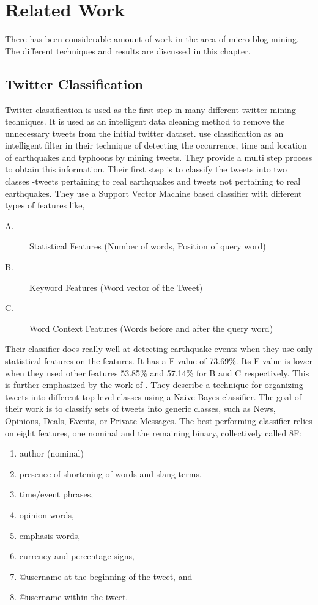 \chapter{Related Work}
\label{chap-two}
There has been considerable amount of work in the area of micro blog mining. The different techniques and results are discussed in this chapter.

\section{Twitter Classification}
Twitter classification is used as the first step in many different twitter mining techniques. It is used as an intelligent data cleaning method to remove the unnecessary tweets from the initial twitter dataset. \citet{Sakaki:2010:EST:1772690.1772777} use classification as an intelligent filter in their technique of detecting the occurrence, time and location of earthquakes and typhoons by mining tweets. They provide a multi step process to obtain this information. Their first step is to classify the tweets into two classes -tweets pertaining to real earthquakes and tweets not pertaining to real earthquakes. They use a Support Vector Machine based classifier with different types of features like,

\begin{description}
\item[A.] Statistical Features (Number of words, Position of query word)
\item[B.] Keyword Features (Word vector of the Tweet)
\item[C.] Word Context Features (Words before and after the query word)
\end{description}

Their classifier does really well at detecting earthquake events when they use only statistical features on the features. It has a F-value of 73.69\%. Its F-value is lower when they used other features 53.85\% and 57.14\% for B and C respectively. This is further emphasized by the work of \citet{Sriram:2010:STC:1835449.1835643}. They describe a technique for organizing tweets into different top level classes using a Naive Bayes classifier. The goal of their work is to classify sets of tweets into generic classes, such as News, Opinions, Deals, Events, or Private Messages. The best performing classifier relies on eight features, one nominal and the remaining binary, collectively called 8F:

\begin{enumerate}
\item author (nominal)
\item presence of shortening of words and slang terms,
\item time/event phrases,
\item opinion words,
\item emphasis words,
\item currency and percentage signs,
\item @username at the beginning of the tweet, and
\item @username within the tweet.
\end{enumerate}

